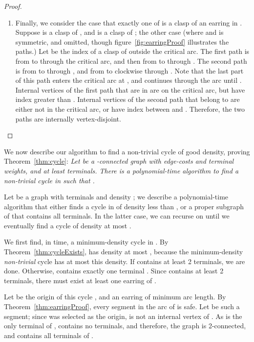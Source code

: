 \documentclass[11pt]{article}
\newenvironment{proofof}[1]{\smallskip\noindent{\bf Proof of #1:}}{\hspace*{\fill}\par}
\begin{document}
\begin{proof}
\begin{enumerate}
  \item Finally, we consider the case that exactly one of 
    is a clasp of an earring in . Suppose  is a clasp
    of , and  is a clasp of ; the other case (where  and
     is symmetric, and omitted, though
    figure~\ref{fig:earringProof} illustrates the paths.) Let  be
    the index of a clasp of  outside the critical arc. The first
    path is from  to  through the critical arc, and then
    from  to  through . The second path is from 
    to  through , and from  to  clockwise
    through . Note that the last part of this path enters the
    critical arc at , and continues through the arc until .
    Internal vertices of the first path that are in  are on the
    critical arc, but have index greater than . Internal vertices
    of the second path that belong to  are either not in the
    critical arc, or have index between  and . Therefore,
    the two paths are internally vertex-disjoint. \qedhere
  \end{enumerate}
\end{proof}

We now describe our algorithm to find a non-trivial cycle of good
density, proving Theorem~\ref{thm:cycle}:
  \emph{Let  be a -connected graph with edge-costs and terminal weights,
  and at least  terminals. There is a polynomial-time algorithm to
  find a non-trivial cycle  in  such that .}

\begin{proofof}{Theorem~\ref{thm:cycle}}
  Let  be a graph with  terminals and density ; we describe
  a polynomial-time algorithm that either finds a cycle in  of density
  less than , or a proper subgraph  of  that contains all 
  terminals. In the latter case, we can recurse on  until we eventually
  find a cycle of density at most .

  We first find, in  time, a minimum-density cycle  in . By
  Theorem~\ref{thm:cycleExists},  has density at most , because
  the minimum-density \emph{non-trivial} cycle has at most this density.
  If  contains at least 2 terminals, we are done. Otherwise, 
  contains exactly one terminal . Since  contains at least 2
  terminals, there must exist at least one earring of .

  Let  be the origin of this cycle , and  an earring of minimum
  arc length. By Theorem~\ref{thm:earringProof}, every segment in the arc
  of  is safe. Let  be such a segment; since  was selected as the
  origin,  is not an internal vertex of . As  is the only terminal
  of ,  contains no terminals, and therefore, the graph 
  is 2-connected, and contains all  terminals of .
\end{proofof}
\end{document}
